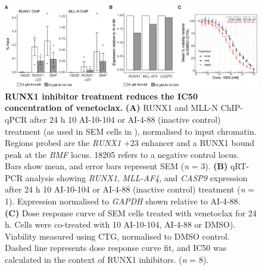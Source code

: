\begin{figure}[t]
    \centering
    \includegraphics[width=\textwidth,height=\textheight,keepaspectratio]{figures/chapter4/chr4_runx1-inh.png}
    \caption[{RUNX1 inhibitor treatment reduces the IC50 concentration of venetoclax.}]
    {\textbf{RUNX1 inhibitor treatment reduces the IC50 concentration of venetoclax.} 
    \textbf{(A)} RUNX1 and MLL-N ChIP-qPCR after 24 h 10 \microm{} AI-10-104 or AI-4-88 (inactive control) treatment (as used in SEM cells in \cite{illendula_small_2016}), normalised to input chromatin. Regions probed are the \textit{RUNX1} +23 enhancer and a RUNX1 bound peak at the \textit{BMF} locus. 18205 refers to a negative control locus. Bars show mean, and error bars represent SEM (\textit{n} = 3).
    \textbf{(B)} qRT-PCR analysis showing \textit{RUNX1}, \textit{MLL-AF4}, and \textit{CASP9} expression after 24 h 10 \microm{} AI-10-104 or AI-4-88 (inactive control) treatment (\textit{n} = 1). Expression normalised to \textit{GAPDH} shown relative to AI-4-88.
    \textbf{(C)} Dose response curve of SEM cells treated with venetoclax for 24 h. Cells were co-treated with 10 \microm{} AI-10-104, AI-4-88 or DMSO). Viability measured using CTG, normalised to DMSO control. Dashed line represents dose response curve fit, and IC50 was calculated in the context of RUNX1 inhibitors. (\textit{n} = 8). 
    }
    \label{fig:ch4_runx1-inh}
\end{figure}

